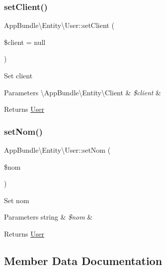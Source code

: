 \subsubsection{\texorpdfstring{set\+Client()}{setClient()}}
{\footnotesize\ttfamily App\+Bundle\textbackslash{}\+Entity\textbackslash{}\+User\+::set\+Client (\begin{DoxyParamCaption}\item[{\textbackslash{}\hyperlink{class_app_bundle_1_1_entity_1_1_client}{App\+Bundle\textbackslash{}\+Entity\textbackslash{}\+Client}}]{\$client = {\ttfamily null} }\end{DoxyParamCaption})}

Set client


\begin{DoxyParams}[1]{Parameters}
\textbackslash{}\+App\+Bundle\textbackslash{}\+Entity\textbackslash{}\+Client & {\em \$client} & \\
\hline
\end{DoxyParams}
\begin{DoxyReturn}{Returns}
\hyperlink{class_app_bundle_1_1_entity_1_1_user}{User} 
\end{DoxyReturn}
\mbox{\label{class_app_bundle_1_1_entity_1_1_user_a974167e2fffad9fdcb9c48bc701a160e}} 
\subsubsection{\texorpdfstring{set\+Nom()}{setNom()}}
{\footnotesize\ttfamily App\+Bundle\textbackslash{}\+Entity\textbackslash{}\+User\+::set\+Nom (\begin{DoxyParamCaption}\item[{}]{\$nom }\end{DoxyParamCaption})}

Set nom


\begin{DoxyParams}[1]{Parameters}
string & {\em \$nom} & \\
\hline
\end{DoxyParams}
\begin{DoxyReturn}{Returns}
\hyperlink{class_app_bundle_1_1_entity_1_1_user}{User} 
\end{DoxyReturn}


\subsection{Member Data Documentation}
\mbox{\label{class_app_bundle_1_1_entity_1_1_user_ae12a261b5ca7565baa6c166854cc9860}} 
